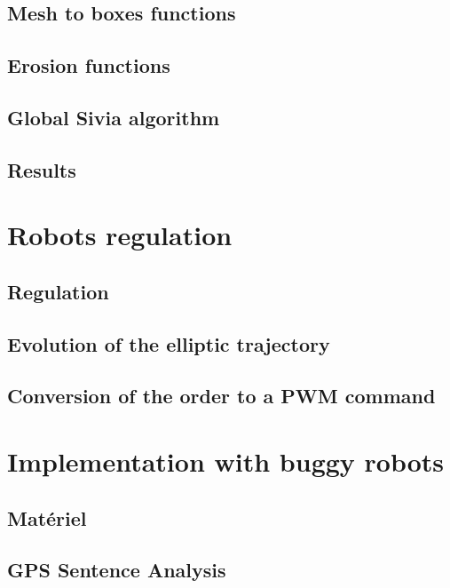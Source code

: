 \documentclass[12pt,fleqn]{report} %
\begin{document}
\section{Mesh to boxes functions}

\section{Erosion functions}

\section{Global Sivia algorithm}

\section{Results}


\chapter{Robots regulation}

\section{Regulation}

\section{Evolution of the elliptic trajectory}

\section{Conversion of the order to a PWM command}

\chapter{Implementation with buggy robots}
\section{Matériel}

\section{GPS Sentence Analysis}

\end{document}
